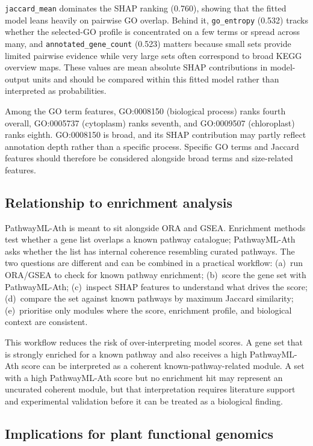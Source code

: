 \documentclass[12pt,twoside]{article}
\begin{document}
\texttt{jaccard\_mean} dominates the SHAP ranking (0.760), showing that the fitted model leans heavily on pairwise GO overlap. Behind it, \texttt{go\_entropy} (0.532) tracks whether the selected-GO profile is concentrated on a few terms or spread across many, and \texttt{annotated\_gene\_count} (0.523) matters because small sets provide limited pairwise evidence while very large sets often correspond to broad KEGG overview maps. These values are mean absolute SHAP contributions in model-output units and should be compared within this fitted model rather than interpreted as probabilities.

Among the GO term features, GO:0008150 (biological process) ranks fourth overall, GO:0005737 (cytoplasm) ranks seventh, and GO:0009507 (chloroplast) ranks eighth. GO:0008150 is broad, and its SHAP contribution may partly reflect annotation depth rather than a specific process. Specific GO terms and Jaccard features should therefore be considered alongside broad terms and size-related features.

\subsection{Relationship to enrichment analysis}
\label{sec:disc_practical_workflow}

PathwayML-Ath is meant to sit alongside ORA and GSEA. Enrichment methods test whether a gene list overlaps a known pathway catalogue; PathwayML-Ath asks whether the list has internal coherence resembling curated pathways. The two questions are different and can be combined in a practical workflow: (a)~run ORA/GSEA to check for known pathway enrichment; (b)~score the gene set with PathwayML-Ath; (c)~inspect SHAP features to understand what drives the score; (d)~compare the set against known pathways by maximum Jaccard similarity; (e)~prioritise only modules where the score, enrichment profile, and biological context are consistent.

This workflow reduces the risk of over-interpreting model scores. A gene set that is strongly enriched for a known pathway and also receives a high PathwayML-Ath score can be interpreted as a coherent known-pathway-related module. A set with a high PathwayML-Ath score but no enrichment hit may represent an uncurated coherent module, but that interpretation requires literature support and experimental validation before it can be treated as a biological finding.

\subsection{Implications for plant functional genomics}
\label{sec:disc_plant_implications}
\end{document}
